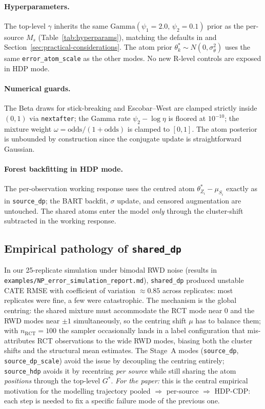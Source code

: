 \documentclass[11pt]{article}
\theoremstyle{plain}
\theoremstyle{definition}
\theoremstyle{remark}
\newcommand{\1}{\mathds{1}}
\begin{document}
\paragraph{Hyperparameters.} The top-level $\gamma$ inherits the same $\mathrm{Gamma}(\psi_1 = 2.0,\, \psi_2 = 0.1)$ prior as the per-source $M_s$ (Table~\ref{tab:hyperparams}), matching the defaults in \citet{teh2006hierarchical} and Section~\ref{sec:practical-considerations}. The atom prior $\theta^*_k \sim N(0, \sigma_\theta^2)$ uses the same \texttt{error\_atom\_scale} as the other modes. No new R-level controls are exposed in HDP mode.

\paragraph{Numerical guards.} The Beta draws for stick-breaking and Escobar--West are clamped strictly inside $(0, 1)$ via \texttt{nextafter}; the Gamma rate $\psi_2 - \log\eta$ is floored at $10^{-10}$; the mixture weight $\omega = \mathrm{odds}/(1 + \mathrm{odds})$ is clamped to $[0, 1]$. The atom posterior is unbounded by construction since the conjugate update is straightforward Gaussian.

\paragraph{Forest backfitting in HDP mode.} The per-observation working response uses the centred atom $\theta^*_{Z_i} - \mu_{S_i}$ exactly as in \texttt{source\_dp}; the BART backfit, $\sigma$ update, and censored augmentation are untouched. The shared atoms enter the model \emph{only} through the cluster-shift subtracted in the working response.

\subsection{Empirical pathology of \texttt{shared\_dp}}

In our 25-replicate simulation under bimodal RWD noise (results in \texttt{examples/NP\_error\_simulation\_report.md}), \texttt{shared\_dp} produced unstable CATE RMSE with coefficient of variation $\approx 0.85$ across replicates: most replicates were fine, a few were catastrophic. The mechanism is the global centring: the shared mixture must accommodate the RCT mode near $0$ and the RWD modes near $\pm 1$ simultaneously, so the centring shift $\mu$ has to balance them; with $n_\mathrm{RCT} = 100$ the sampler occasionally lands in a label configuration that mis-attributes RCT observations to the wide RWD modes, biasing both the cluster shifts and the structural mean estimates. The Stage~A modes (\texttt{source\_dp}, \texttt{source\_dp\_scale}) avoid the issue by decoupling the centring entirely; \texttt{source\_hdp} avoids it by recentring \emph{per source} while still sharing the atom \emph{positions} through the top-level $G^*$. \emph{For the paper:} this is the central empirical motivation for the modelling trajectory pooled $\Rightarrow$ per-source $\Rightarrow$ HDP-CDP: each step is needed to fix a specific failure mode of the previous one.
\end{document}
